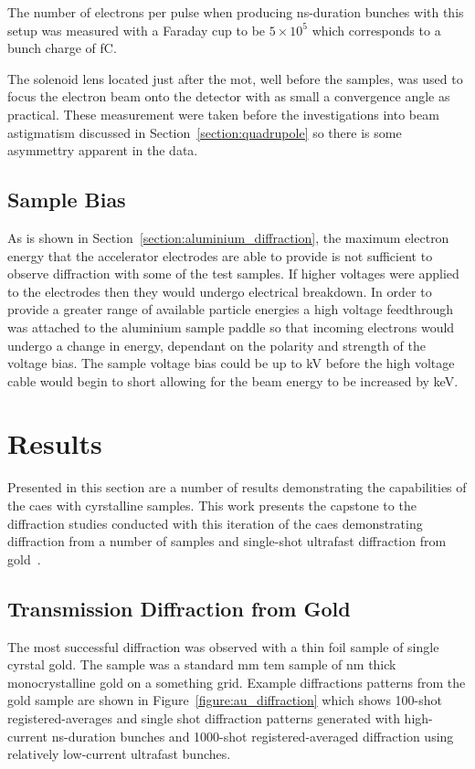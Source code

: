 The number of electrons per pulse when producing ns-duration bunches with this setup was measured with a Faraday cup to be $5\times10^5$ which corresponds to a bunch charge of \unit[80]{fC}.

The solenoid lens located just after the \gls{mot}, well before the samples, was used to focus the electron beam onto the detector with as small a convergence angle as practical.
These measurement were taken before the investigations into beam astigmatism discussed in Section~\ref{section:quadrupole} so there is some asymmettry apparent in the data.

\subsection{Sample Bias}\label{section:sample_bias}

As is shown in Section~\ref{section:aluminium_diffraction}, the maximum electron energy that the accelerator electrodes are able to provide is not sufficient to observe diffraction with some of the test samples.
If higher voltages were applied to the electrodes then they would undergo electrical breakdown.
In order to provide a greater range of available particle energies a high voltage feedthrough was attached to the aluminium sample paddle so that incoming electrons would undergo a change in energy, dependant on the polarity and strength of the voltage bias.
The sample voltage bias could be up to \unit[7]{kV} before the high voltage cable would begin to short allowing for the beam energy to be increased by \unit[7]{keV}.

\section{Results}

Presented in this section are a number of results demonstrating the capabilities of the \gls{caes} with cyrstalline samples.
This work presents the capstone to the diffraction studies conducted with this iteration of the \gls{caes} demonstrating diffraction from a number of samples and single-shot ultrafast diffraction from gold~\cite{speirs_single-shot_2015}.

\subsection{Transmission Diffraction from Gold}

The most successful diffraction was observed with a thin foil sample of single cyrstal gold.
The sample was a standard \unit[3]{mm} \gls{tem} sample of \unit[11]{nm} thick monocrystalline gold on a {\color{red}something} grid.
Example diffractions patterns from the gold sample are shown in Figure~\ref{figure:au_diffraction} which shows 100-shot registered-averages and single shot diffraction patterns generated with high-current ns-duration bunches and 1000-shot registered-averaged diffraction using relatively low-current ultrafast bunches.

